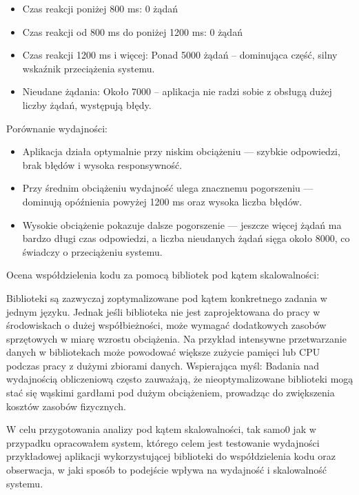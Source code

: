\documentclass[runningheads,12pt]{llncs}
\begin{document}
\begin{itemize}
    \item Czas reakcji poniżej 800 ms: 0 żądań
    \item Czas reakcji od 800 ms do poniżej 1200 ms:  0 żądań
    \item Czas reakcji 1200 ms i więcej: Ponad 5000 żądań – dominująca część, silny wskaźnik przeciążenia systemu.
    \item Nieudane żądania: Około 7000 – aplikacja nie radzi sobie z obsługą dużej liczby żądań, występują błędy.
\end{itemize}

Porównanie wydajności: 

\begin{itemize}
    \item Aplikacja działa optymalnie przy niskim obciążeniu — szybkie odpowiedzi, brak błędów i wysoka responsywność.
    \item Przy średnim obciążeniu wydajność ulega znacznemu pogorszeniu — dominują opóźnienia powyżej 1200 ms oraz wysoka liczba błędów.
    \item Wysokie obciążenie pokazuje dalsze pogorszenie — jeszcze więcej żądań ma bardzo długi czas odpowiedzi, a liczba nieudanych żądań sięga około 8000, co świadczy o przeciążeniu systemu.
\end{itemize}

\newpage


Ocena współdzielenia kodu za pomocą bibliotek pod kątem skalowalności:

Biblioteki są zazwyczaj zoptymalizowane pod kątem konkretnego zadania w jednym języku. Jednak jeśli biblioteka nie jest zaprojektowana do pracy w środowiskach o dużej współbieżności, może wymagać dodatkowych zasobów sprzętowych w miarę wzrostu obciążenia. Na przykład intensywne przetwarzanie danych w bibliotekach może powodować większe zużycie pamięci lub CPU podczas pracy z dużymi zbiorami danych. Wspierająca myśl: Badania nad wydajnością obliczeniową często zauważają, że nieoptymalizowane biblioteki mogą stać się wąskimi gardłami pod dużym obciążeniem, prowadząc do zwiększenia kosztów zasobów fizycznych. ~\cite[p. 192]{fowler2012patterns}

W celu przygotowania analizy pod kątem skalowalności, tak samo0 jak w przypadku opracowałem system, którego celem jest testowanie wydajności przykładowej aplikacji wykorzystującej biblioteki do współdzielenia kodu oraz obserwacja, w jaki sposób to podejście wpływa na wydajność i skalowalność systemu.
\end{document}
